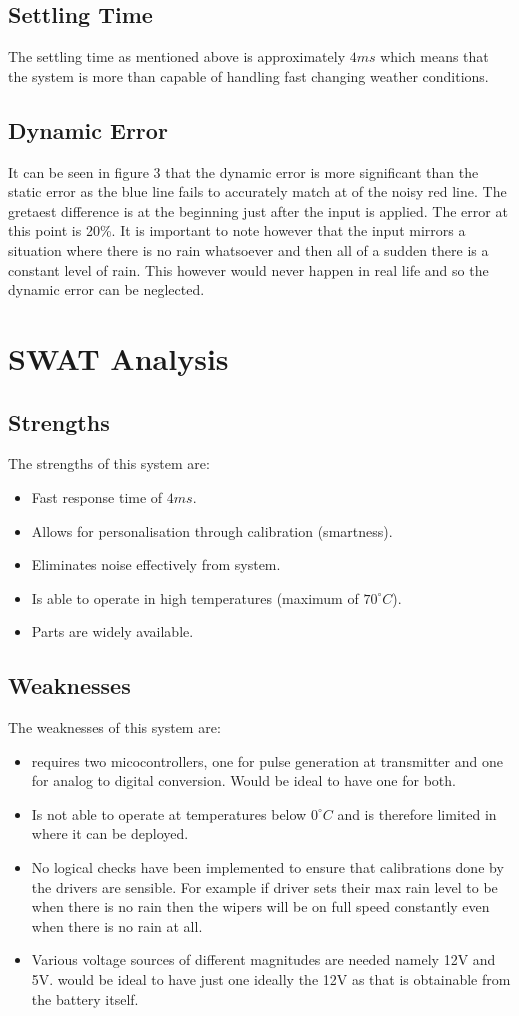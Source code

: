 \documentclass[conference, 11pt]{IEEEtran}
\begin{document}
\subsection{Settling Time}
The settling time as mentioned above is approximately $4ms$ which means that the system is more than capable of handling fast changing weather conditions. 

\subsection{Dynamic Error}
It can be seen in figure 3 that the dynamic error is more significant than the static error as the blue line fails to accurately match at of the noisy red line. The gretaest difference is at the beginning just after the input is applied. The error at this point is 20\%. It is important to note however that the input mirrors a situation where there is no rain whatsoever and then all of a sudden there is a constant level of rain. This however would never happen in real life and so the dynamic error can be neglected.  


\section{SWAT Analysis}
\subsection{Strengths}
The strengths of this system are:
\begin{itemize}
\item Fast response time of $4ms$.
\item Allows for personalisation through calibration (smartness).
\item Eliminates noise effectively from system.
\item Is able to operate in high temperatures (maximum of $70^{\circ}C$).
\item Parts are widely available. 
\end{itemize}

\subsection{Weaknesses}
The weaknesses of this system are:
\begin{itemize}
\item requires two micocontrollers, one for pulse generation at transmitter and one for analog to digital conversion. Would be ideal to have one for both. 
\item Is not able to operate at temperatures below $0^{\circ}C$ and is therefore limited in where it can be deployed. 
\item No logical checks have been implemented to ensure that calibrations done by the drivers are sensible. For example if driver sets their max rain level to be when there is no rain then the wipers will be on full speed constantly even when there is no rain at all. 
\item Various voltage sources of different magnitudes are needed namely 12V and 5V. would be ideal to have just one ideally the 12V as that is obtainable from the battery itself. 
\end{itemize}
\end{document}
